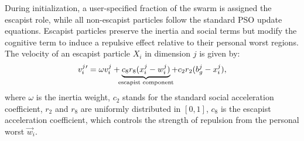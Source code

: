 {During initialization, a user-specified fraction of the swarm is assigned the escapist role, while all non-escapist particles follow the standard PSO update equations. Escapist particles preserve the inertia and social terms but modify the cognitive term to induce a repulsive effect relative to their personal worst regions.
The velocity of an escapist particle $X_i$ in dimension $j$ is given by:
\begin{equation}\label{eq:velocity_update_escapist}
    v_{i}^{j}{}' = \omega v_{i}^{j} +
\underbrace{c_8 r_8 (x_{i}^{j} - w_{i}^{j})}_{\mathclap{\text{escapist component}}} +
c_2 r_2 (b_{g}^{j} - x_{i}^{j}),
\end{equation}
where
$\omega$ is the inertia weight,
$c_2$ stands for the standard social acceleration coefficient,
$r_2$ and $r_8$ are uniformly distributed in $[0, 1]$,
$c_8$ is the escapist acceleration coefficient, which controls the strength of repulsion from the personal worst $\vec{w}_i$.

\begin{figure}[H]
    \centering
\end{figure}}

